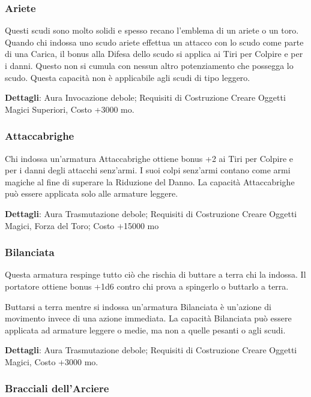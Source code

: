 \begin{multicols}{2}
\subsubsection*{Ariete}

Questi scudi sono molto solidi e spesso recano l'emblema di un ariete o un toro. Quando chi indossa uno scudo ariete effettua un attacco con lo scudo come parte di una Carica, il bonus alla Difesa dello scudo si applica ai Tiri per Colpire e per i danni. Questo non si cumula con nessun altro potenziamento che possegga lo scudo. Questa capacità non è applicabile agli scudi di tipo leggero.

\textbf{Dettagli}: Aura Invocazione debole; Requisiti di Costruzione Creare Oggetti Magici Superiori, Costo +3000 mo.


\subsubsection*{Attaccabrighe}

Chi indossa un'armatura Attaccabrighe ottiene bonus +2 ai Tiri per Colpire e per i danni degli attacchi senz'armi. I suoi colpi senz'armi contano come armi magiche al fine di superare la Riduzione del Danno. La capacità Attaccabrighe può essere applicata solo alle armature leggere.

\textbf{Dettagli}: Aura Trasmutazione debole; Requisiti di Costruzione Creare Oggetti Magici, Forza del Toro; Costo +15000 mo

\subsubsection*{Bilanciata}

Questa armatura respinge tutto ciò che rischia di buttare a terra chi la indossa. Il portatore ottiene bonus +1d6 contro chi prova a spingerlo o buttarlo a terra.

Buttarsi a terra mentre si indossa un'armatura Bilanciata è un'azione di movimento invece di una azione immediata. La capacità Bilanciata può essere applicata ad armature leggere o medie, ma non a quelle pesanti o agli scudi.

\textbf{Dettagli}: Aura Trasmutazione debole; Requisiti di Costruzione Creare Oggetti Magici, Costo +3000 mo.

\subsubsection*{Bracciali dell'Arciere}


\end{multicols}
